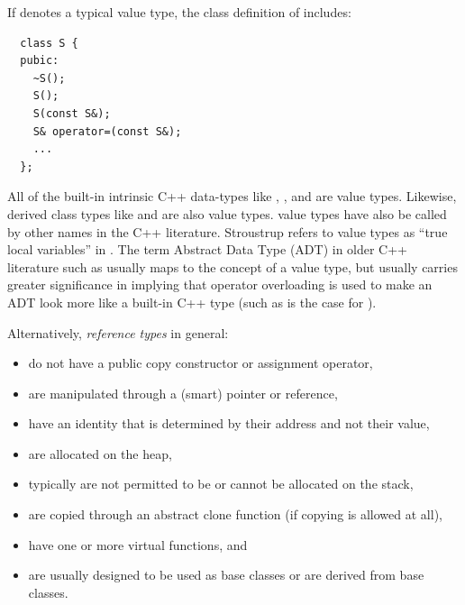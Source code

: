 \documentclass[pdf,ps2pdf,11pt]{SANDreport}
\begin{document}
If {} denotes a typical value type, the class definition of
{} includes:

{\small\begin{verbatim}
  class S {
  pubic:
    ~S();
    S();
    S(const S&);
    S& operator=(const S&);
    ...
  };
\end{verbatim}}

All of the built-in intrinsic C++ data-types like {},
{}, and {} are value types.  Likewise, derived
class types like {} and {} are also
value types.  value types have also be called by other names in the
C++ literature.  Stroustrup refers to value types as ``true local
variables'' in {}\cite{stroustrup94}.  The term Abstract Data Type
(ADT) in older C++ literature such as {}\cite{AdvancedC++92} usually
maps to the concept of a value type, but usually carries greater
significance in implying that operator overloading is used to make an
ADT look more like a built-in C++ type (such as is the case for
{}).

Alternatively, {}\textit{reference types} in general:

\begin{itemize}

{}\item do not have a public copy constructor or assignment operator,

{}\item are manipulated through a (smart) pointer or reference,

{}\item have an identity that is determined by their address and not
their value,

{}\item are allocated on the heap,

{}\item typically are not permitted to be or cannot be allocated on
the stack,

{}\item are copied through an abstract clone function (if copying is
allowed at all),

{}\item have one or more virtual functions, and

{}\item are usually designed to be used as base classes or are derived
from base classes.

\end{itemize}
\end{document}

